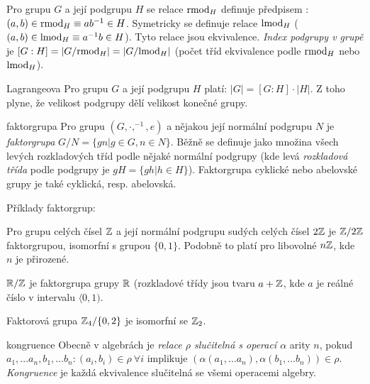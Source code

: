 \begin{definice}
Pro grupu $G$ a její podgrupu $H$ se relace $\mathrm{rmod}_H$ definuje předpisem : $(a,b)\in\mathrm{rmod}_H\equiv ab^{-1}\in H$. Symetricky se definuje relace $\mathrm{lmod}_H$ ($(a,b)\in\mathrm{lmod}_H\equiv a^{-1}b\in H$). Tyto relace jsou ekvivalence. \emph{Index podgrupy v grupě} je $[G:H]=|G/\mathrm{rmod}_H|=|G/\mathrm{lmod}_H|$ (počet tříd ekvivalence podle $\mathrm{rmod}_H$ nebo $\mathrm{lmod}_H$).
\end{definice}

\begin{vetaN}{Lagrangeova}
Pro grupu $G$ a její podgrupu $H$ platí: $|G|=[G:H]\cdot|H|$. Z toho plyne, že velikost podgrupy dělí velikost konečné grupy.
\end{vetaN}


\begin{definiceN}{faktorgrupa}
Pro grupu $(G,\cdot,^{-1},e)$ a nějakou její normální podgrupu $N$ je \emph{faktorgrupa} $G/N=\{gn|g\in G,n\in N\}$. Běžně se definuje jako množina všech levých rozkladových tříd podle nějaké normální podgrupy (kde levá \emph{rozkladová třída} podle podgrupy je $gH=\{gh|h\in H\}$). Faktorgrupa cyklické nebo abelovské grupy je také cyklická, resp. abelovská.
\end{definiceN}

\begin{priklady}
Příklady faktorgrup:
\begin{pitemize}
    \item Pro grupu celých čísel $\mathbb{Z}$ a její normální podgrupu sudých celých čísel $2\mathbb{Z}$ je $\mathbb{Z}/2\mathbb{Z}$ faktorgrupou, isomorfní s grupou $\{0,1\}$. Podobně to platí pro libovolné $n\mathbb{Z}$, kde $n$ je přirozené.
    \item $\mathbb{R}/\mathbb{Z}$ je faktorgrupa grupy $\mathbb{R}$ (rozkladové třídy jsou tvaru $a + \mathbb{Z}$, kde $a$ je reálné číslo v intervalu $\langle 0,1)$.
    \item Faktorová grupa $\mathbb{Z}_4/\{0,2\}$ je isomorfní se $\mathbb{Z}_2$. 
\end{pitemize}
\end{priklady}

\begin{definiceN}{kongruence}
Obecně v algebrách je \emph{ relace $\rho$ slučitelná s operací $\alpha$} arity $n$, pokud $a_1,\dots a_n, b_1,\dots b_n : (a_i,b_i)\in\rho\ \forall i$ implikuje $(\alpha(a_1,\dots a_n),\alpha(b_1,\dots b_n))\in\rho$. \emph{Kongruence} je každá ekvivalence slučitelná se všemi operacemi algebry.
\end{definiceN}

